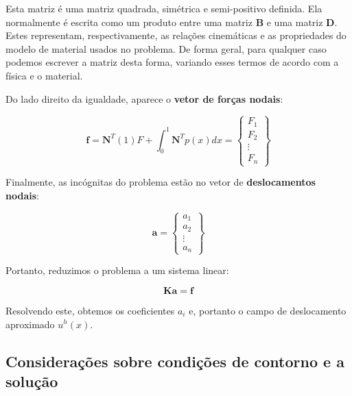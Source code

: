         Esta matriz é uma matriz quadrada, simétrica e semi-positivo definida. Ela normalmente é escrita como um produto entre uma matriz $\mathbf{B}$ e uma matriz $\mathbf{D}$. Estes representam, respectivamente, as relações cinemáticas e as propriedades do modelo de material usados no problema. De forma geral, para qualquer caso podemos escrever a matriz desta forma, variando esses termos de acordo com a física e o material.

        Do lado direito da igualdade, aparece o \textbf{vetor de forças nodais}:

        \begin{equation}
            \mathbf{f} = \mathbf{N}^T(1) F + \int_0^1 \mathbf{N}^T p(x) dx =
            \begin{Bmatrix}
                F_1\\
                F_2\\
                \vdots\\
                F_n
            \end{Bmatrix}
        \end{equation}

        Finalmente, as incógnitas do problema estão no vetor de \textbf{deslocamentos nodais}:

        \begin{equation*}
            \mathbf{a} =
            \begin{Bmatrix}
                a_1\\
                a_2\\
                \vdots\\
                a_n
            \end{Bmatrix}
        \end{equation*}

        Portanto, reduzimos o problema a um sistema linear:

        \begin{equation}
            \mathbf{K} \mathbf{a} = \mathbf{f} 
        \end{equation}

        Resolvendo este, obtemos os coeficientes $a_i$ e, portanto o campo de deslocamento aproximado $u^h(x)$.
    
    \subsection{Considerações sobre condições de contorno e a solução}
    \label{sec:condicao_contorno}

